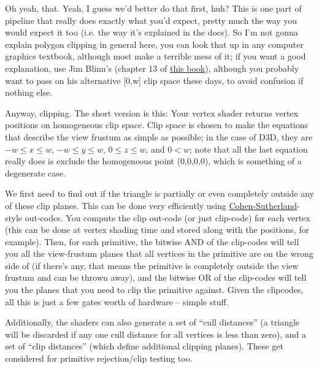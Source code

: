 \documentclass[12pt]{article}
\begin{document}
Oh yeah, that. Yeah, I guess we’d better do that first, huh? This is one part of pipeline that really does exactly what you’d expect, pretty much the way you would expect it too (i.e. the way it’s explained in the docs). So I’m not gonna explain polygon clipping in general here, you can look that up in any computer graphics textbook, although most make a terrible mess of it; if you want a good explanation, use Jim Blinn’s (chapter 13 of \href{http://www.amazon.com/Jim-Blinns-Corner-Graphics-Pipeline/dp/1558603875}{this book}), although you probably want to pass on his alternative [0,w] clip space these days, to avoid confusion if nothing else.

Anyway, clipping. The short version is this: Your vertex shader returns vertex positions on homogeneous clip space. Clip space is chosen to make the equations that describe the view frustum as simple as possible; in the case of D3D, they are \(-w \le x \le w\), \(-w \le y \le w\), \(0 \le z \le w\), and \(0 < w\); note that all the last equation really does is exclude the homogeneous point (0,0,0,0), which is something of a degenerate case.

We first need to find out if the triangle is partially or even completely outside any of these clip planes. This can be done very efficiently using \href{http://en.wikipedia.org/wiki/Cohen\%E2\%80\%93Sutherland}{Cohen-Sutherland}-style out-codes. You compute the clip out-code (or just clip-code) for each vertex (this can be done at vertex shading time and stored along with the positions, for example). Then, for each primitive, the bitwise AND of the clip-codes will tell you all the view-frustum planes that all vertices in the primitive are on the wrong side of (if there’s any, that means the primitive is completely outside the view frustum and can be thrown away), and the bitwise OR of the clip-codes will tell you the planes that you need to clip the primitive against. Given the clipcodes, all this is just a few gates worth of hardware – simple stuff.

Additionally, the shaders can also generate a set of “cull distances” (a triangle will be discarded if any one cull distance for all vertices is less than zero), and a set of “clip distances” (which define additional clipping planes). These get considered for primitive rejection/clip testing too.
\end{document}
